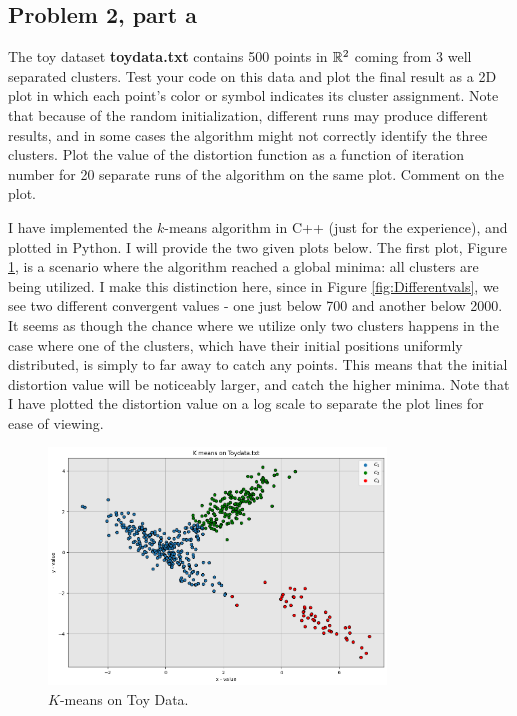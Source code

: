 \subsection{Problem 2, part a}
The toy dataset \textbf{toydata.txt} contains 500 points in $\mathbb{R}^2$ coming from 3 well separated clusters. Test your code on this data and plot the final result as a 2D plot in which each point’s color or symbol indicates its cluster assignment. Note that because of the random initialization, different runs may produce different results, and in some cases the algorithm might not correctly identify the three clusters. Plot the value of the distortion function as a function of iteration number for 20 separate runs of the algorithm on the same plot. Comment on the plot.
\partbreak
\begin{solution}

    I have implemented the $k$-means algorithm in C++ (just for the experience), and plotted in Python. I will provide the two given plots below. The first plot, Figure \ref{fig:kmeans}, is a scenario where the algorithm reached a global minima: all clusters are being utilized. I make this distinction here, since in Figure \ref{fig:Differentvals}, we see two different convergent values - one just below 700 and another below 2000. It seems as though the chance where we utilize only two clusters happens in the case where one of the clusters, which have their initial positions uniformly distributed, is simply to far away to catch any points. This means that the initial distortion value will be noticeably larger, and catch the higher minima. Note that I have plotted the distortion value on a log scale to separate the plot lines for ease of viewing.   

    
\end{solution}

\begin{figure}
    \centering
    \includegraphics[width = 0.8\textwidth]{Figure/kmeans.png}
    \caption{$K$-means on Toy Data.}
    \label{fig:kmeans}
\end{figure}

